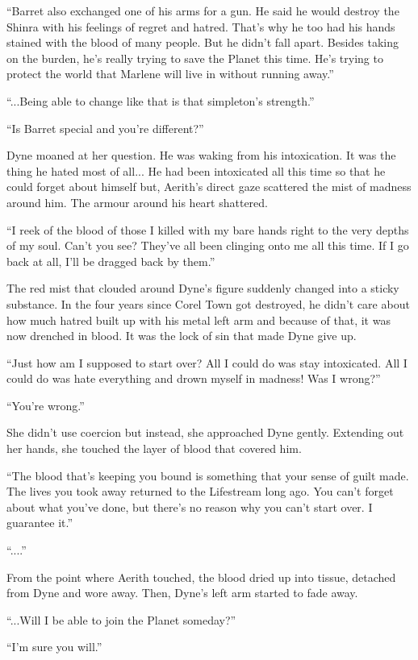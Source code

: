 \documentclass[oneside]{book}
\begin{document}
“Barret also exchanged one of his arms for a gun. He said he would destroy the Shinra with his feelings of regret and hatred. That's why he too had his hands stained with the blood of many people. But he didn't fall apart. Besides taking on the burden, he's really trying to save the Planet this time. He's trying to protect the world that Marlene will live in without running away.”

“...Being able to change like that is that simpleton's strength.”

“Is Barret special and you're different?”

Dyne moaned at her question. He was waking from his intoxication. It was the thing he hated most of all... He had been intoxicated all this time so that he could forget about himself but, Aerith's direct gaze scattered the mist of madness around him. The armour around his heart shattered.

“I reek of the blood of those I killed with my bare hands right to the very depths of my soul. Can't you see? They've all been clinging onto me all this time. If I go back at all, I'll be dragged back by them.”

The red mist that clouded around Dyne's figure suddenly changed into a sticky substance. In the four years since Corel Town got destroyed, he didn't care about how much hatred built up with his metal left arm and because of that, it was now drenched in blood. It was the lock of sin that made Dyne give up.

“Just how am I supposed to start over? All I could do was stay intoxicated. All I could do was hate everything and drown myself in madness! Was I wrong?”

“You're wrong.”

She didn't use coercion but instead, she approached Dyne gently. Extending out her hands, she touched the layer of blood that covered him.

“The blood that's keeping you bound is something that your sense of guilt made. The lives you took away returned to the Lifestream long ago. You can't forget about what you've done, but there's no reason why you can't start over. I guarantee it.”

“....”

From the point where Aerith touched, the blood dried up into tissue, detached from Dyne and wore away. Then, Dyne's left arm started to fade away.

“...Will I be able to join the Planet someday?”

“I'm sure you will.”
\end{document}
